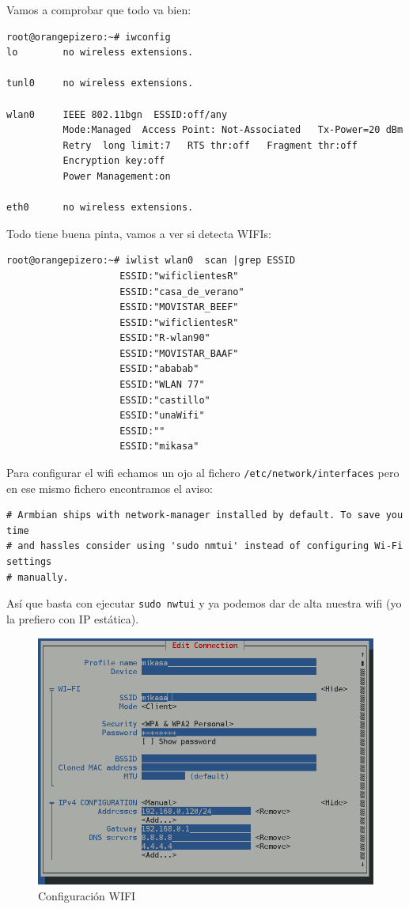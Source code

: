 \documentclass[12pt,spanish,]{scrartcl}
\begin{document}
Vamos a comprobar que todo va bien:

\begin{verbatim}
root@orangepizero:~# iwconfig
lo        no wireless extensions.

tunl0     no wireless extensions.

wlan0     IEEE 802.11bgn  ESSID:off/any
          Mode:Managed  Access Point: Not-Associated   Tx-Power=20 dBm
          Retry  long limit:7   RTS thr:off   Fragment thr:off
          Encryption key:off
          Power Management:on

eth0      no wireless extensions.
\end{verbatim}

Todo tiene buena pinta, vamos a ver si detecta WIFIs:

\begin{verbatim}
root@orangepizero:~# iwlist wlan0  scan |grep ESSID
                    ESSID:"wificlientesR"
                    ESSID:"casa_de_verano"
                    ESSID:"MOVISTAR_BEEF"
                    ESSID:"wificlientesR"
                    ESSID:"R-wlan90"
                    ESSID:"MOVISTAR_BAAF"
                    ESSID:"ababab"
                    ESSID:"WLAN 77"
                    ESSID:"castillo"
                    ESSID:"unaWifi"
                    ESSID:""
                    ESSID:"mikasa"
\end{verbatim}

Para configurar el wifi echamos un ojo al fichero
\texttt{/etc/network/interfaces} pero en ese mismo fichero encontramos
el aviso:

\begin{verbatim}
# Armbian ships with network-manager installed by default. To save you time
# and hassles consider using 'sudo nmtui' instead of configuring Wi-Fi settings
# manually.
\end{verbatim}

Así que basta con ejecutar \texttt{sudo\ nwtui} y ya podemos dar de alta
nuestra wifi (yo la prefiero con IP estática).

\begin{figure}[htbp]
\centering
\includegraphics{src/img/OrangePiZero_tmtui.png}
\caption{Configuración WIFI}
\end{figure}
\end{document}
